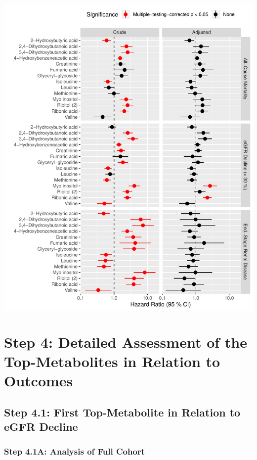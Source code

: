 \documentclass[]{article}
\begin{document}
\includegraphics{0033_PROFIL--Metabolomics_files/figure-latex/Surv-Compilation-Combined-From-3-Forest-Log-1.pdf}

\newpage

\hypertarget{step-4-detailed-assessment-of-the-top-metabolites-in-relation-to-outcomes}{%
\section{Step 4: Detailed Assessment of the Top-Metabolites in Relation
to
Outcomes}\label{step-4-detailed-assessment-of-the-top-metabolites-in-relation-to-outcomes}}

\hypertarget{step-4.1-first-top-metabolite-in-relation-to-egfr-decline}{%
\subsection{Step 4.1: First Top-Metabolite in Relation to eGFR
Decline}\label{step-4.1-first-top-metabolite-in-relation-to-egfr-decline}}

\hypertarget{step-4.1a-analysis-of-full-cohort}{%
\subsubsection{Step 4.1A: Analysis of Full
Cohort}\label{step-4.1a-analysis-of-full-cohort}}
\end{document}
